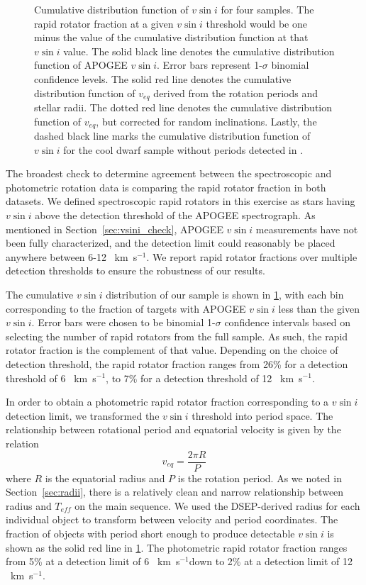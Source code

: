 \documentclass[manuscript]{aastex6}
\newcommand{\vsini}{\ensuremath{v \sin i}}
\newcommand{\Teff}{\ensuremath{T_{eff}}}
\newcommand{\kms}{\textrm{~km~s}\ensuremath{^{-1}}}
\begin{document}
\begin{figure}[htb]
    \caption{Cumulative distribution function of \vsini{} for four
    samples. The rapid rotator fraction at a given \vsini{} threshold
    would be one minus the value of the cumulative distribution function
    at that \vsini{} value. The solid black line denotes the cumulative
    distribution function of APOGEE \vsini{}. Error bars represent 
    1-\(\sigma\) binomial confidence levels. The solid red line denotes
    the cumulative distribution function of \(v_{eq}\) derived from the
    rotation periods and stellar radii. The dotted red line denotes the
    cumulative distribution function of \(v_{eq}\), but corrected for
    random inclinations. Lastly, the dashed black line marks the
    cumulative distribution function of \vsini{} for the cool dwarf
    sample without periods detected in 
    \citet{McQuillan14}.\label{fig:detection_fraction}}
\end{figure}

The broadest check to determine agreement between the spectroscopic
and photometric rotation data is comparing the rapid rotator fraction
in both datasets. We defined spectroscopic rapid rotators in this exercise as 
stars having \vsini{} above the detection threshold of the APOGEE 
spectrograph. As mentioned in 
Section~\ref{sec:vsini_check}, APOGEE \vsini{} measurements have not been fully
characterized, and the detection limit could reasonably be placed anywhere 
between 6-12 \kms{}. We report rapid rotator fractions over multiple detection 
thresholds to ensure the robustness of our results.

The cumulative \vsini{} distribution of our sample is shown in
\cref{fig:detection_fraction}, with each bin corresponding to the
fraction of targets with APOGEE \vsini{} less than the given
\vsini{}. Error bars were chosen to be binomial 1-\(\sigma\) confidence 
intervals based on selecting the number of rapid rotators from the full 
sample.  As such, the rapid rotator fraction is the complement of that
value. Depending on the choice of detection threshold, the rapid rotator 
fraction ranges from 26\% for a detection threshold of 6 \kms, to 7\%
for a detection threshold of 12 \kms.

In order to obtain a photometric rapid rotator fraction corresponding to
a \vsini{} detection limit, we transformed the \vsini{} threshold into period 
space. The relationship between rotational period and equatorial velocity is 
given by the relation 
\begin{displaymath}
    v_{eq} = \frac{2 \pi R}{P} 
\end{displaymath}
where \(R\) is the equatorial radius and \(P\) is the rotation period. As we
noted in Section~\ref{sec:radii}, there is a relatively clean and narrow
relationship between radius and \Teff{} on the main sequence. We used the 
DSEP-derived radius for each individual object to transform  between
velocity and period coordinates. The fraction of objects with period
short enough to produce detectable \vsini{} is shown as the solid red
line in \cref{fig:detection_fraction}. The photometric rapid rotator fraction
ranges from 5\% at a detection limit of 6 \kms down to 2\% at a 
detection limit of 12 \kms.
\end{document}
